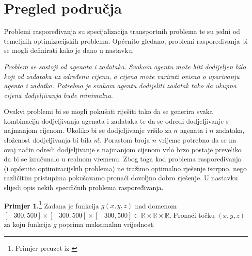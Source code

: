 \documentclass[times, utf8, zavrsni]{fer}
\begin{document}
\chapter{Pregled područja}
Problemi raspoređivanja su specijalizacija transportnih problema te su jedni od temeljnih optimizacijskih problema.
Općenito gledano, problemi raspoređivanja bi se mogli definirati kako je dano u nastavku.
\begin{framed}
\emph{Problem se sastoji od agenata i zadataka. Svakom agentu može biti dodijeljen bilo koji od zadataka uz određenu cijenu, a cijena
može varirati ovisno o uparivanju agenta i zadatka. Potrebno je svakom agentu dodijeliti zadatak tako da ukupna cijena dodjeljivanja
bude minimalna.}
\end{framed}

Ovakvi problemi bi se mogli pokušati riješiti tako da se generira svaka kombinacija dodjeljivanja agenata i zadataka te da se
odredi dodjeljivanje s najmanjom cijenom. Ukoliko bi se dodjeljivanje vršilo za $n$ agenata i $n$ zadataka, složenost dodjeljivanja bi bila $n!$.
Porastom broja $n$ vrijeme potrebno da se na ovaj način odredi dodjeljivanje s najmanjom cijenom vrlo brzo postaje preveliko da bi se izračunalo u realnom vremenu.
Zbog toga kod problema raspoređivanja (i općenito optimizacijskih problema) ne tražimo optimalno rješenje iscrpno, nego različitim pristupima pokušavamo pronaći dovoljno
 dobro rješenje. U nastavku slijedi opis nekih specifičnih problema raspoređivanja.

\textbf{Primjer 1.}\footnote{Primjer preuzet iz \citep{cupic2013prirodom}}
Zadana je funkcija $g(x, y, z)$ nad domenom $[-300, 500] \times [-300, 500] \times [-300, 500] \subset
\mathbb{R} \times \mathbb{R} \times \mathbb{R}$. Pronaći točku $(x, y, z)$ za koju funkcija $g$ poprima maksimalnu vrijednost.
\end{document}
